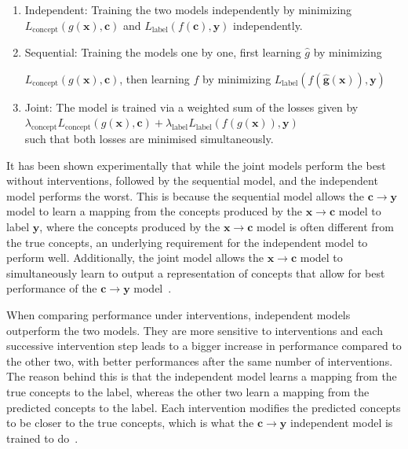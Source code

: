 \begin{enumerate}
    \item Independent: Training the two models independently by minimizing
    $L_{\text{concept}}(g(\mathbf{x}), \mathbf{c})$ and $L_{\text{label}}(f(\mathbf{c}), \mathbf{y})$ independently.
    \item Sequential: Training the models one by one, first learning
    $\hat{g}$ by minimizing 
    
    $L_{\text{concept}}(g(\mathbf{x}), \mathbf{c})$,
    then learning $f$ by minimizing $L_{\text{label}}(f(\mathbf{\hat{g}(\mathbf{x})}), \mathbf{y})$
    \item Joint: The model is trained via a weighted sum of the losses given by \\ 
    $\lambda_{\text{concept}} L_{\text{concept}}(g(\mathbf{x}), \mathbf{c}) + \lambda_{\text{label}} L_{\text{label}}(f(g(\mathbf{x})), \mathbf{y})$ \\
    such that both losses are minimised simultaneously.
\end{enumerate}

It has been shown experimentally that while the joint models perform the best
without interventions, followed by the sequential model, and the independent model
performs the worst. This is because the sequential model allows the $\mathbf{c} \to \mathbf{y}$ 
model to learn a mapping from the concepts produced by the $\mathbf{x} \to \mathbf{c}$ model to
label $\mathbf{y}$, where the concepts produced by the $\mathbf{x} \to \mathbf{c}$ model is often different
from the true concepts, an underlying requirement for the independent model to perform well. Additionally,
the joint model allows the $\mathbf{x} \to \mathbf{c}$ model to simultaneously learn to output a representation
of concepts that allow for best performance of the $\mathbf{c} \to \mathbf{y}$ model~\cite{cbm}.

When comparing performance under interventions,
independent models outperform the two models.
They are more sensitive to interventions and each successive intervention step
leads to a bigger increase in performance compared to the other two,
with better performances after the same number of interventions.
The reason behind this
is that the independent model learns a mapping from the true concepts to the label,
whereas the other two learn a mapping from the predicted concepts to the label. Each intervention
modifies the predicted concepts to be closer to the true concepts, which is what the 
$\mathbf{c} \to \mathbf{y}$ independent model is trained to do~\cite{cbm}.

